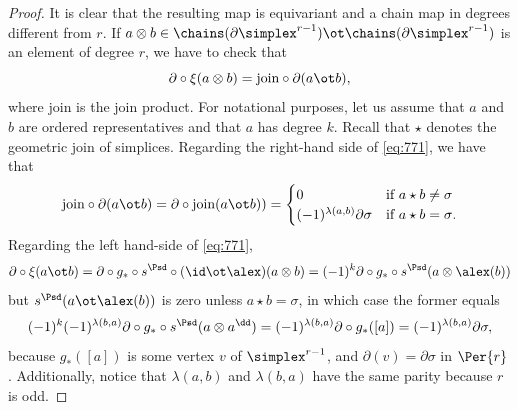 \begin{proof} It is clear that the resulting map is equivariant and a chain map in degrees different from $r$. If $a\otimes b \in \chains(\partial\simplex^{r-1})\ot \chains(\partial\simplex^{r-1})$ is an element of degree $r$, we have to check that 
\begin{equation}\label{eq:771}
	\partial\circ \xi(a\otimes b) = \text{join}\circ \partial (a\ot b),
\end{equation}
where $\text{join}$ is the join product. For notational purposes, let us assume that $a$ and $b$ are ordered representatives and that $a$ has degree $k$. Recall that $\star$ denotes the geometric join of simplices. Regarding the right-hand side of \eqref{eq:771}, we have that
\[
	\text{join}\circ \partial(a\ot b) = \partial\circ \text{join}(a\ot b)) = \begin{cases} 0 &\text{if $a\star b\neq  \sigma$} \\ (-1)^{\lambda(a,b)} \partial \sigma & \text{if $a\star b = \sigma$}.\end{cases}
\] 
Regarding the left hand-side of \eqref{eq:771},
\[
	\partial\circ \xi(a\ot b) 
	= \partial\circ g_*\circ s^{\Psd}\circ (\id \ot \alex)(a\otimes b) 
	= (-1)^{k}\partial\circ g_*\circ s^{\Psd}(a\otimes \alex(b))%
\]
but $s^{\Psd}(a\ot \alex(b))$ is zero unless $a\star b = \sigma$, in which case the former equals
\[
	(-1)^{k}(-1)^{\lambda(b,a)} \partial\circ g_*\circ s^{\Psd}(a\otimes a^\dd)
	= (-1)^{\lambda(b,a)} \partial\circ g_* ([a])
	= (-1)^{\lambda(b,a)}\partial \sigma,
\]
because $g_*([a])$ is some vertex $v$ of $\simplex^{r-1}$, and $\partial(v) = \partial\sigma$ in $\Per{r}$. Additionally, notice that $\lambda(a,b)$ and $\lambda(b,a)$ have the same parity because $r$ is odd.



\end{proof}

